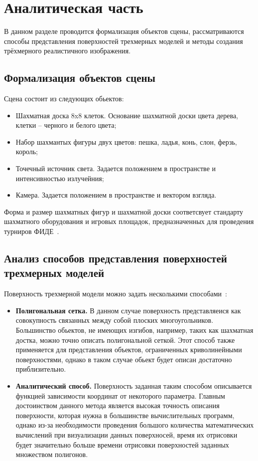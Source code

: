 \chapter{Аналитическая часть}


В данном разделе проводится формализация объектов сцены, рассматриваются способы представления поверхностей трехмерных моделей и методы создания трёхмерного реалистичного изображения.

\section{Формализация объектов сцены}
Сцена состоит из следующих обьектов:
\begin{itemize}
	\item Шахматная доска 8x8 клеток. Основание шахматной доски цвета дерева, клетки -- черного и белого цвета;
	\item Набор шахмантых фигуры двух цветов: пешка, ладья, конь, слон, ферзь, король;
	\item Точечный источник света. Задается положением в пространстве и интенсивностью излучейния;
	\item Камера. Задается положением в пространстве и вектором взгляда.
\end{itemize}

Форма и размер шахматных фигур и шахматной доски соответсвует стандарту шахматного оборудования и игровых площадок, предназначенных для проведения турниров ФИДЕ~\cite{FIDE2015}.

\clearpage
\section{Анализ способов представления поверхностей трехмерных моделей}
Поверхность трехмерной модели можно задать несколькими способами~\cite{deymin}:
\begin{itemize}
	\item \textbf{Полигональная сетка.} В данном случае поверхность представляеися как совокупность связанных между собой плоских многоугольников. Большинство обьектов, не имеющих изгибов, например, таких как шахматная достка, можно точно описать полигональной сеткой. Этот способ также применяется для представления объектов, ограниченных криволинейными
	поверхностями, однако в таком случае обьект будет описан достаточно приблизительно.
	
	\item \textbf{Аналитический способ.} Поверхность заданная таким способом описывается функцией зависимости координат от некоторого параметра. Главным достоинством данного метода является высокая точность описания поверхности, которая нужна в большинстве вычислительных программ, однако из-за необходимости проведения большого количества математических вычислений при визуализации данных поверхносей, время их отрисовки будет значительно больше времени отрисовки поверхностей заданных множеством полигонов.
\end{itemize}

